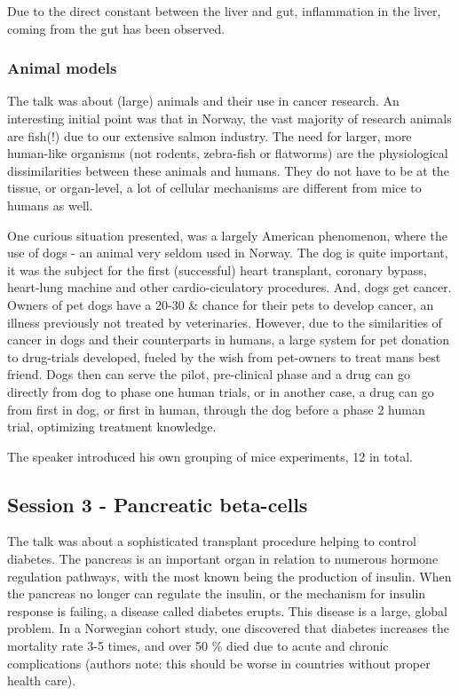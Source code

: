 \documentclass[12p]{article}
\begin{document}
Due to the direct constant between the liver and gut, inflammation in the liver, coming from the gut has been observed.

\subsubsection{Animal models}

The talk was about (large) animals and their use in cancer research.
An interesting initial point was that in Norway, the vast majority of research animals are fish(!) due to our extensive salmon industry.
The need for larger, more human-like organisms (not rodents, zebra-fish or flatworms) are the physiological dissimilarities between these animals and humans.
They do not have to be at the tissue, or organ-level, a lot of cellular mechanisms are different from mice to humans as well.

One curious situation presented, was a largely American phenomenon, where the use of dogs - an animal very seldom used in Norway.
The dog is quite important, it was the subject for the first (successful) heart transplant, coronary bypass, heart-lung machine and other cardio-ciculatory procedures.
And, dogs get cancer.
Owners of pet dogs have a 20-30 \& chance for their pets to develop cancer, an illness previously not treated by veterinaries.
However, due to the similarities of cancer in dogs and their counterparts in humans, a large system for pet donation to drug-trials developed, fueled by the wish from pet-owners to treat mans best friend.
Dogs then can serve the pilot, pre-clinical phase and a drug can go directly from dog to phase one human trials, or in another case, a drug can go from first in dog, or first in human, through the dog before a phase 2 human trial, optimizing treatment knowledge.

The speaker introduced his own grouping of mice experiments, 12 in total.

\subsection*{Session 3 - Pancreatic beta-cells}

The talk was about a sophisticated transplant procedure helping to control diabetes.
The pancreas is an important organ in relation to numerous hormone regulation pathways, with the most known being the production of insulin.
When the pancreas no longer can regulate the insulin, or the mechanism for insulin response is failing, a disease called diabetes erupts.
This disease is a large, global problem.
In a Norwegian cohort study, one discovered that diabetes increases the mortality rate 3-5 times, and over 50 \% died due to acute and chronic complications (authors note: this should be worse in countries without proper health care).
\end{document}
